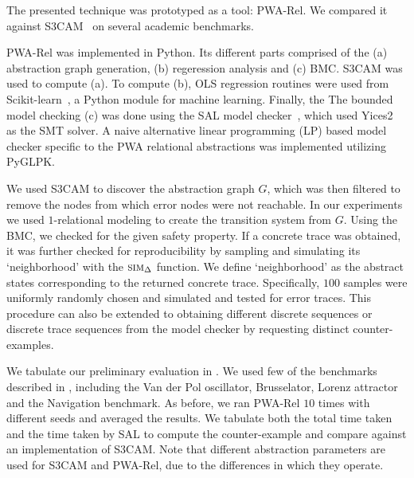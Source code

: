 The presented technique was prototyped as a tool: PWA-Rel.
We compared it against S3CAM~\cite{zutshi2014multiple} on several academic
benchmarks.

PWA-Rel was implemented in Python. Its different parts comprised of
the (a) abstraction graph generation, (b) regeression analysis and (c)
BMC. S3CAM was used to compute (a). To compute (b), OLS regression
routines were used from Scikit-learn~\cite{pedregosa2011scikit}, a
Python module for machine learning. Finally, the The bounded model
checking (c) was done using the SAL model checker~\cite{SAL-SRI},
which used Yices2~\cite{dutertre2014yices} as the SMT solver. A naive
alternative linear programming (LP) based model checker specific to the PWA
relational abstractions was implemented utilizing PyGLPK.

We used S3CAM to discover the abstraction graph $G$, which was then
filtered to remove the nodes from which error nodes were not
reachable. In our experiments we used $1$-relational modeling to
create the transition system from $G$. Using the BMC, we checked for
the given safety property. If a concrete trace was obtained, it was
further checked for reproducibility by sampling and simulating its `neighborhood' with the
$\mbox{\sc sim}_\Delta$ function. We define `neighborhood' as the abstract states
corresponding to the returned concrete trace. Specifically, $100$
samples were uniformly randomly chosen and simulated and tested for
error traces. This procedure can also be extended to obtaining
different discrete sequences or discrete trace sequences from the
model checker by requesting distinct counter-examples.


We tabulate our preliminary evaluation in . We used
few of the benchmarks described in \cite{zutshi2014multiple},
including the Van der Pol oscillator, Brusselator, Lorenz attractor
and the Navigation benchmark. As before, we ran PWA-Rel $10$ times
with different seeds and averaged the results. We tabulate both the
total time taken and the time taken by SAL to compute the
counter-example and compare against an implementation of S3CAM. Note
that different abstraction parameters are used for S3CAM and
PWA-Rel, due to the differences in which they operate.

